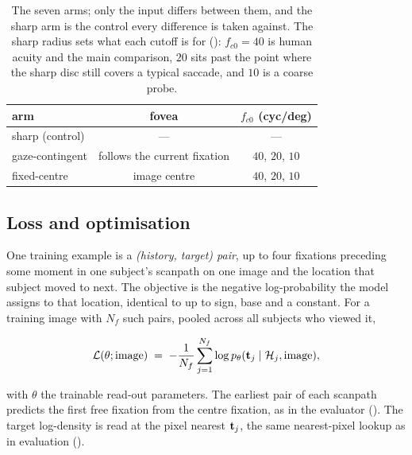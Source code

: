\begin{table}[tbp]
  \centering
  \caption[The seven arms]{The seven arms; only the input differs between them, and the sharp arm is the
    control every difference is taken against. The sharp radius sets what each cutoff is for
    (): $f_{c0} = 40$ is human acuity and the main comparison, $20$ sits
    past the point where the sharp disc still covers a typical saccade, and $10$ is a coarse probe.}
  \label{tab:arms}
  \small
  \begin{tabular}{lcc}
    \toprule
    arm & fovea & $f_{c0}$ (cyc/deg) \\
    \midrule
    sharp (control)   & ---                          & --- \\
    \addlinespace[2pt]
    gaze-contingent   & follows the current fixation & $40$, $20$, $10$ \\
    \addlinespace[2pt]
    fixed-centre      & image centre                 & $40$, $20$, $10$ \\
    \bottomrule
  \end{tabular}
\end{table}

\subsection{Loss and optimisation}
\label{subsec:training-loop}

One training example is a \emph{(history, target) pair}, up to four fixations preceding some moment in one
subject's scanpath on one image and the location that subject moved to next.
The objective is the negative log-probability the model assigns to that location, identical to
 up to sign, base and a constant.
For a training image with $N_f$ such pairs, pooled across all subjects who viewed it,

\begin{equation}
  \mathcal{L}(\theta; \text{image})
  \;=\;
  -\frac{1}{N_f} \sum_{j=1}^{N_f} \log p_{\theta}(\mathbf{t}_j \mid \mathcal{H}_j, \text{image}),
  \label{eq:training-loss}
\end{equation}

with $\theta$ the trainable read-out parameters. The earliest pair of each scanpath predicts the first
free fixation from the centre fixation, as in the evaluator ().
The target log-density is read at the pixel nearest $\mathbf{t}_j$, the same nearest-pixel lookup as in
evaluation ().

